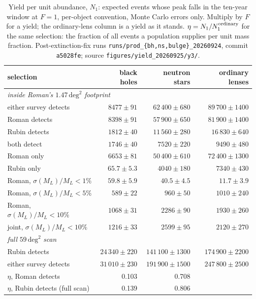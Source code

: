 \documentclass[english,10pt,a4paper]{article}
\begin{document}
	\begin{table}[htbp]
		\centering
		\small
		\begin{tabular}{lrrr}
			\toprule
			selection & black holes & neutron stars & ordinary lenses \\
			\midrule
			\multicolumn{4}{l}{\emph{inside Roman's $1.47\,\mathrm{deg}^2$ footprint}} \\
			either survey detects         & $8477\pm91$  & $62\,400\pm680$ & $89\,700\pm1400$ \\
			Roman detects                 & $8398\pm91$  & $57\,900\pm650$ & $81\,900\pm1400$ \\
			Rubin detects                 & $1812\pm40$  & $11\,560\pm280$ & $16\,830\pm640$ \\
			both detect                   & $1746\pm40$  & $7520\pm220$    & $9490\pm480$ \\
			Roman only                    & $6653\pm81$  & $50\,400\pm610$ & $72\,400\pm1300$ \\
			Rubin only                    & $65.7\pm5.3$ & $4040\pm180$    & $7340\pm430$ \\
			Roman, $\sigma(M_L)/M_L<1\%$  & $59.8\pm5.9$ & $40.5\pm4.5$    & $11.7\pm3.9$ \\
			Roman, $\sigma(M_L)/M_L<5\%$  & $589\pm22$   & $960\pm50$      & $1010\pm240$ \\
			Roman, $\sigma(M_L)/M_L<10\%$ & $1068\pm31$  & $2286\pm90$     & $1930\pm260$ \\
			joint, $\sigma(M_L)/M_L<10\%$ & $1216\pm33$  & $2599\pm95$     & $2120\pm270$ \\
			\midrule
			\multicolumn{4}{l}{\emph{full $59\,\mathrm{deg}^2$ scan}} \\
			Rubin detects                 & $24\,340\pm220$ & $141\,100\pm1300$ & $174\,900\pm2200$ \\
			either survey detects         & $31\,010\pm230$ & $191\,900\pm1500$ & $247\,800\pm2500$ \\
			\midrule
			$\eta$, Roman detects             & 0.103 & 0.708 & \\
			$\eta$, Rubin detects (full scan) & 0.139 & 0.806 & \\
			\bottomrule
		\end{tabular}
		\caption{Yield per unit abundance, $N_1$: expected events whose peak falls in the ten-year window at $F=1$, per-object convention, Monte Carlo errors only. Multiply by $F$ for a yield; the ordinary-lens column is a yield as it stands. $\eta = N_1/N_1^{\rm ordinary}$ for the same selection: the fraction of all events a population supplies per unit mass fraction. Post-extinction-fix runs \texttt{runs/prod\_\{bh,ns,bulge\}\_20260924}, commit \texttt{a5028fe}; source \texttt{figures/yield\_20260925/y3/}.}
		\label{tab:n1}
	\end{table}
\end{document}
